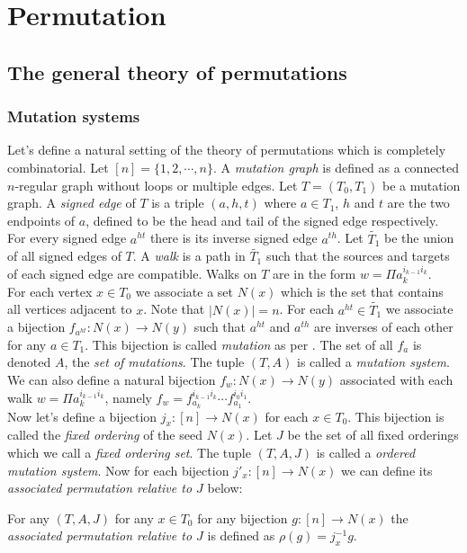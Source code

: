 \chapter{Permutation}\label{C1}
\section{The general theory of permutations}
\subsection{Mutation systems}
\indent Let's define a natural setting of the theory of permutations which is completely combinatorial. Let $[n]=\{1,2,\cdots,n\}$.  A \textit{mutation graph} is defined as a connected $n$-regular graph without loops or multiple edges. Let $T=(T_0,T_1)$ be a mutation graph. A \textit{signed edge} of $T$ is a triple $(a,h,t)$ where $a\in T_1$, $h$ and $t$ are the two endpoints of $a$, defined to be the head and tail of the signed edge respectively. For every signed edge $a^{ht}$ there is its inverse signed edge $a^{th}$. Let $\tilde{T_1}$ be the union of all signed edges of $T$. A \textit{walk} is a path in $\tilde{T_1}$ such that the sources and targets of each signed edge are compatible. Walks on $T$ are in the form  $w=\Pi a_k^{i_{k-1} i_k}$.\\ 
\indent For each vertex $x\in T_0$ we associate a set $N(x)$ which is the set that contains all vertices adjacent to $x$. Note that $|N(x)|=n$. For each $a^{ht}\in\tilde{T_1}$ we associate a bijection $f_{a^{ht}}: N(x)\to N(y)$ such that $a^{ht}$ and $a^{th}$ are inverses of each other for any $a\in T_1$. This bijection is called \textit{mutation} as per \cite{FZ06}. The set of all $f_a$ is denoted $A$, the \textit{set of mutations}. The tuple $(T,A)$ is called a \textit{mutation system}. We can also define a natural bijection $f_w:N(x)\to N(y)$ associated with each walk $w=\Pi a_k^{i_{k-1} i_k}$, namely $f_w=f_{a_k}^{i_{k-1}i_k}\cdots f_{a_1}^{i_0i_1}$.\\
\indent Now let's define a bijection $j_x:[n]\to N(x)$ for each $x\in T_0$. This bijection is called the \textit{fixed ordering} of the seed $N(x)$. Let $J$ be the set of all fixed orderings which we call a \textit{fixed ordering set}. The tuple $(T,A,J)$ is called a \textit{ordered mutation system}. Now for each bijection $j'_x:[n]\to N(x)$ we can define its \textit{associated permutation relative to $J$} below:\\
\begin{definition}
For any $(T,A,J)$ for any $x\in T_0$ for any bijection $g:[n]\to N(x)$ the \textit{associated permutation relative to $J$} is defined as $\rho(g)=j_x^{-1}g$. \\
\end{definition}
